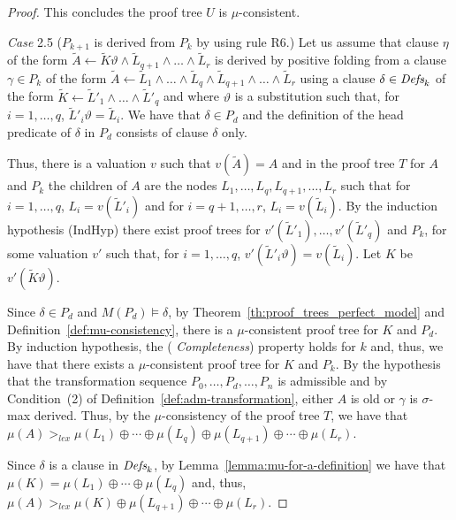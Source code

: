 \documentclass[english]{tlp}
\newcommand{\tA}{{\widetilde{A}}}
\newcommand{\tK}{{\widetilde{K}}}
\newcommand{\tL}{{\widetilde{L}}}
\renewcommand{\mathit}{\displaystyle}
\begin{document}
\begin{proof}
This concludes 
the proof tree $U$ is $\mu$-consistent.

\medskip 

\noindent \emph{Case} 2.5 ($P_{k+1}$ is derived from $P_k$ by using
rule R6.) Let us assume that clause \( \eta  \) of the form 
$\tA \leftarrow \tK\vartheta \wedge\tL_{q+1} \wedge\ldots \wedge \tL_r$
is derived by positive folding from a
clause $\gamma\in P_k$ of the form $\tA\leftarrow \tL_1\wedge\ldots 
\wedge \tL_q\wedge\tL_{q+1} \wedge\ldots \wedge \tL_r$  using a clause 
$\delta\in\mbox{\it Defs}_k$ of the form
$\tK\leftarrow \tL'_1\wedge\ldots \wedge \tL'_q$ and
where
$\vartheta$ is a substitution such that, for $i\!=\!1,\ldots,q$, 
$\tL'_i\vartheta\!=\!\tL_i$. 
We have that
$\delta\in P_d$ and the definition of the head predicate of $\delta$ in $ P_d$
consists of clause $\delta$ only. 

Thus, there is a valuation $v$ such that $v(\tA)=A$ and
in the proof tree $T$ for $A$ and $P_k$ the children of $A$ are
the nodes $L_1,\ldots,L_q,L_{q+1},\ldots,L_r$ such that for $i=1,\ldots,q$, $L_i=v(\tL'_i)$
and for $i=q+1,\ldots,r$, $L_i=v(\tL_i)$. By the induction hypothesis (IndHyp) 
there exist proof trees for $v'(\tL'_1),\ldots, v'(\tL'_q)$ and $P_k$,  for some
valuation $v'$ such that, for $i\!=\!1,\ldots,q$, $v'(\tL'_i\vartheta)=v(\tL_i)$. 
Let $K$ be $v'(\tK\vartheta)$. 

Since $\delta\in P_d$ and $M(P_d)\models \delta$, by
Theorem~\ref{th:proof_trees_perfect_model} and
Definition~\ref{def:mu-consistency}, there is a $\mu$-consistent
proof tree for $K$ and $P_d$. 
By induction hypothesis, the ({\em
Completeness}) property holds for $k$ and, thus, we have that
there exists a $\mu$-consistent proof tree for $K$ and $P_k$. By the
hypothesis that the transformation sequence
$P_0,\ldots,P_d,\ldots,P_n$ is admissible and by Condition~(2) of
Definition~\ref{def:adm-transformation}, either $A$
 is old or $\gamma$ is $\sigma$-max derived. Thus, by the
$\mu$-consistency of the proof tree $T$, we have that $\mu(A)>_{\mathit lex}
\mu(L_1)\oplus\cdots\oplus\mu(L_q)\oplus\mu(L_{q+1})
\oplus\cdots\oplus\mu(L_r)$. 

Since $\delta$ is a clause in $\mbox{\it Defs}_k$, by 
Lemma~\ref{lemma:mu-for-a-definition}  we have that $\mu(K) =
\mu(L_1)\oplus\cdots\oplus\mu(L_q)$ 
and, thus,
$\mu(A)>_{\mathit lex} \mu(K)\oplus\mu(L_{q+1})
\oplus\cdots\oplus\mu(L_r)$. 


\end{proof}
\end{document}
